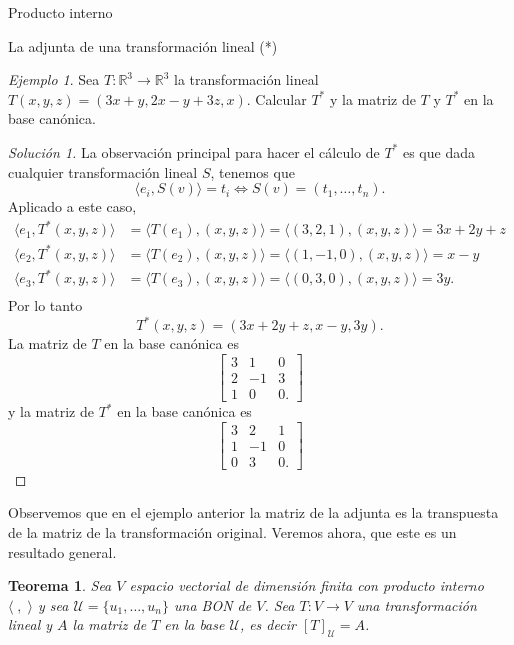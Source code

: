 \documentclass[a4paper,12pt,twoside,spanish,reqno]{amsbook}
\numberwithin{equation}{section}
\newtheorem{teorema}{Teorema}[section]
\theoremstyle{definition}
\theoremstyle{remark}
\newtheorem*{ejemplo*}{Ejemplo}
\newcommand{\la}{\langle}
\newcommand{\ra}{\rangle}
\newcommand{\R}{\mathbb R}
\begin{document}
\begin{chapter}{Producto interno}
\begin{section}{La adjunta de una transformación lineal (*)}
        
        \begin{ejemplo*}\label{ejemplo4.10}
            Sea $T: \R^3 \to \R^3$ la transformación lineal $T(x,y,z) = (3x +y, 2x -y+ 3z, x)$. Calcular $T^*$ y la matriz de $T$ y $T^*$ en la base canónica.  
        \end{ejemplo*}
        \begin{proof}[Solución 1] 
            La observación principal para hacer el cálculo de $T^*$ es que dada cualquier transformación lineal $S$, tenemos que 
            $$
            \la e_i, S(v)\ra  = t_i \Leftrightarrow S(v) = (t_1,\ldots,t_n). 
            $$ 
            Aplicado a este caso,
            \begin{align*}
            \la e_1, T^*(x,y,z)\ra  &= \la  T(e_1),(x,y,z)\ra =    \la (3,2,1),(x,y,z)\ra = 3x+2y+z \\
            \la e_2, T^*(x,y,z)\ra  &= \la  T(e_2),(x,y,z)\ra =    \la (1,-1,0),(x,y,z)\ra = x-y \\
            \la e_3, T^*(x,y,z)\ra  &= \la  T(e_3),(x,y,z)\ra =    \la (0,3,0),(x,y,z)\ra = 3y. \\
            \end{align*}
            Por lo tanto
            $$
            T^*(x,y,z) = (3x+2y+z,x-y,3y).
            $$
            La matriz de $T$ en la base canónica es 
            $$
            \left[\begin{matrix}
            3&1&0\\2&-1&3\\1&0&0.
            \end{matrix}
            \right]
            $$
            y la matriz de $T^*$ en la base canónica es
            $$
            \left[\begin{matrix}
            3&2&1\\1&-1&0\\0&3&0.
            \end{matrix}
            \right]
            $$
        \end{proof}
        
        
        Observemos que en el ejemplo anterior la matriz de la adjunta es la transpuesta de la matriz de la transformación original. Veremos ahora, que este es un resultado general. 
        
        \begin{teorema}\label{matrizadjunta}
            Sea $V$ espacio vectorial de dimensión finita con producto interno $\la \;,\;\ra$ y sea  $\mathcal U = \{u_1, \ldots , u_n\}$ una BON de $V$. Sea $T: V \to V$ una transformación lineal y $A$ la matriz de $T$ en  la base $\mathcal U$,  es decir $[T]_{\mathcal U} = A$.
            

\end{teorema}
\end{section}
\end{chapter}
\end{document}

